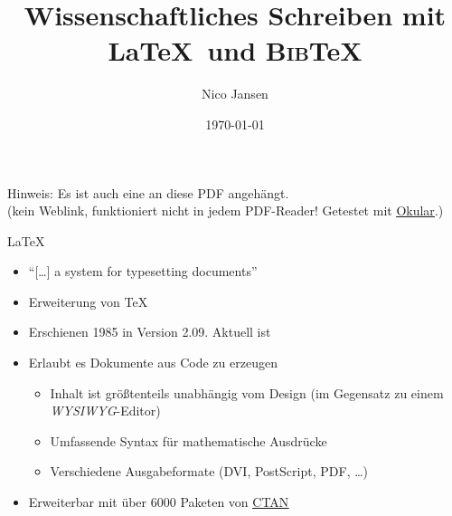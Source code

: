 \documentclass[aspectratio=169]{beamer}
\title{Wissenschaftliches Schreiben mit \LaTeX~und \textsc{Bib}\TeX}
\author{Nico Jansen}
\date{\today}
\newif\iflightmode
\providecommand{\tightlist}{\setlength{\itemsep}{0pt}\setlength{\parskip}{0pt}}
\newcommand\citestyle[1]{\textcolor{foreground-secondary}{\textsuperscript{#1}}}
\let\oldautocite\autocite
\renewcommand{\autocite}[1]{\citestyle{\oldautocite{#1}}}
\begin{document}
        \begin{frame}
            \maketitle
            \iflightmode
            \else
                \textcolor{foreground-secondary}{
                    Hinweis: Es ist auch eine 
                    an diese PDF angehängt. \\
                    (kein Weblink, funktioniert nicht in jedem PDF-Reader! Getestet mit \href{https://okular.kde.org)}{\alert{\underline{Okular}}}.)
                }
            \fi
        \end{frame}

    
        
    \begin{frame}{\LaTeX}
    \protect\hypertarget{section}{}
    \begin{itemize}
    \tightlist
    \item
      \enquote{[\ldots] a system for typesetting documents}\autocite{latex}
    \item
      Erweiterung von \TeX\autocite{latex}
    \item
      Erschienen 1985 in Version 2.09. Aktuell ist
      \autocite{latex}
    \item
      Erlaubt es Dokumente aus Code zu erzeugen\autocite{latex}

      \begin{itemize}
      \tightlist
      \item
        Inhalt ist größtenteils unabhängig vom Design (im Gegensatz zu
        einem \emph{WYSIWYG}-Editor)\autocite{latex}
      \item
        Umfassende Syntax für mathematische Ausdrücke\autocite{latex}
      \item
        Verschiedene Ausgabeformate (DVI\autocite{latex},
        PostScript\autocite{ctan-dvips}, PDF\autocite{ctan-dvipdfmx},
        \ldots)
      \end{itemize}
    \item
      Erweiterbar mit über 6000 Paketen von
      \href{https://ctan.org}{\alert{\underline{CTAN}}}\autocite{ctan}
    \end{itemize}
    \end{frame}
\end{document}
